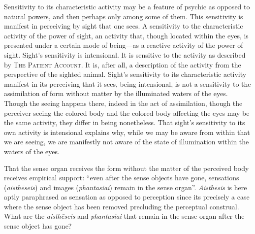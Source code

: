 Sensitivity to its characteristic activity may be a feature of psychic as opposed to natural powers, and then perhaps only among some of them. This sensitivity is manifest in perceiving by sight that one sees. A sensitivity to the characteristic activity of the power of sight, an activity that, though located within the eyes, is presented under a certain mode of being—as a reactive activity of the power of sight. Sight's sensitivity is intensional. It is sensitive to the activity as described by \textsc{The Patient Account}. It is, after all, a description of the activity from the perspective of the sighted animal. Sight's sensitivity to its characteristic activity manifest in its perceiving that it sees, being intensional, is not a sensitivity to the assimilation of form without matter by the illuminated waters of the eyes. Though the seeing happens there, indeed in the act of assimilation, though the perceiver seeing the colored body and the colored body affecting the eyes may be the same activity, they differ in being nonetheless. That sight's sensitivity to its own activity is intensional explains why, while we may be aware from within that we are seeing, we are manifestly not aware of the state of illumination within the waters of the eyes.




That the sense organ receives the form without the matter of the perceived body receives empirical support: ``even after the sense objects have gone, sensations (\emph{aisthēseis}) and images (\emph{phantasiai}) remain in the sense organ''. \emph{Aisthēsis} is here aptly paraphrased as sensation as opposed to perception since its precisely a case where the sense object has been removed precluding the perceptual construal. What are the \emph{aisthēseis} and \emph{phantasiai} that remain in the sense organ after the sense object has gone?

